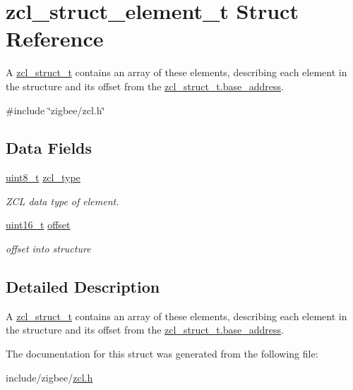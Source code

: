 \hypertarget{structzcl__struct__element__t}{}\section{zcl\+\_\+struct\+\_\+element\+\_\+t Struct Reference}
\label{structzcl__struct__element__t}


A \hyperlink{structzcl__struct__t}{zcl\+\_\+struct\+\_\+t} contains an array of these elements, describing each element in the structure and its offset from the \hyperlink{group__zcl_ga2c4fcaeccedd1b62207f9bb03a26fdf1}{zcl\+\_\+struct\+\_\+t.\+base\+\_\+address}.  




{\ttfamily \#include \char`\"{}zigbee/zcl.\+h\char`\"{}}

\subsection*{Data Fields}
\begin{DoxyCompactItemize}
\item 
\hyperlink{group__hal__dos_gae1affc9ca37cfb624959c866a73f83c2}{uint8\+\_\+t} \hyperlink{group__zcl_ga6934aa0a5db19737df5eec9c2fdeb997}{zcl\+\_\+type}
\begin{DoxyCompactList}\small\item\em Z\+CL data type of element. \end{DoxyCompactList}\item 
\hyperlink{group__hal__dos_ga5a8b2dc9e45a9ee81a94ef304fb62505}{uint16\+\_\+t} \hyperlink{group__zcl_gac681806181c80437cfab37335f62ff39}{offset}
\begin{DoxyCompactList}\small\item\em offset into structure \end{DoxyCompactList}\end{DoxyCompactItemize}


\subsection{Detailed Description}
A \hyperlink{structzcl__struct__t}{zcl\+\_\+struct\+\_\+t} contains an array of these elements, describing each element in the structure and its offset from the \hyperlink{group__zcl_ga2c4fcaeccedd1b62207f9bb03a26fdf1}{zcl\+\_\+struct\+\_\+t.\+base\+\_\+address}. 

The documentation for this struct was generated from the following file\+:\begin{DoxyCompactItemize}
\item 
include/zigbee/\hyperlink{zcl_8h}{zcl.\+h}\end{DoxyCompactItemize}
